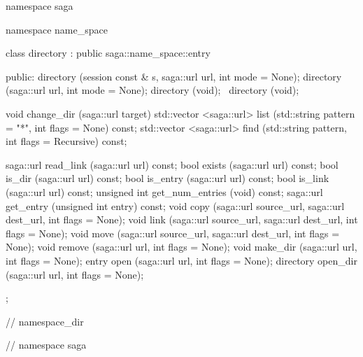   \begin{mycode}[label=Prototype: saga::namespace::directory]
   namespace saga
   {
     namespace name_space 
     {
       class directory 
           : public saga::name_space::entry
       {
         public:
           directory  (session const & s, 
                       saga::url       url, 
                       int             mode = None);
           directory  (saga::url       url, 
                       int             mode = None);
           directory  (void);
           ~directory (void);
 
           void        change_dir (saga::url    target)
           std::vector <saga::url> 
                       list       (std::string  pattern = "*", 
                                   int          flags   = None) const;
           std::vector <saga::url> 
                       find       (std::string  pattern, 
                                   int          flags   = Recursive) const;
 
           saga::url   read_link  (saga::url    url) const;
           bool        exists     (saga::url    url) const;
           bool        is_dir     (saga::url    url) const;
           bool        is_entry   (saga::url    url) const;
           bool        is_link    (saga::url    url) const;
           unsigned    int get_num_entries 
                                  (void) const;
           saga::url   get_entry  (unsigned int entry) const;
           void        copy       (saga::url    source_url, 
                                   saga::url    dest_url, 
                                   int          flags = None);
           void        link       (saga::url    source_url, 
                                   saga::url    dest_url, 
                                   int          flags = None);
           void        move       (saga::url    source_url, 
                                   saga::url    dest_url, 
                                   int          flags = None);
           void        remove     (saga::url    url, 
                                   int          flags = None);
           void        make_dir   (saga::url    url, 
                                   int          flags = None);
           entry       open       (saga::url    url, 
                                   int          flags = None);
           directory   open_dir   (saga::url    url, 
                                   int          flags = None);
       };
     } // namespace_dir
   } // namespace saga
 
 \end{mycode}


